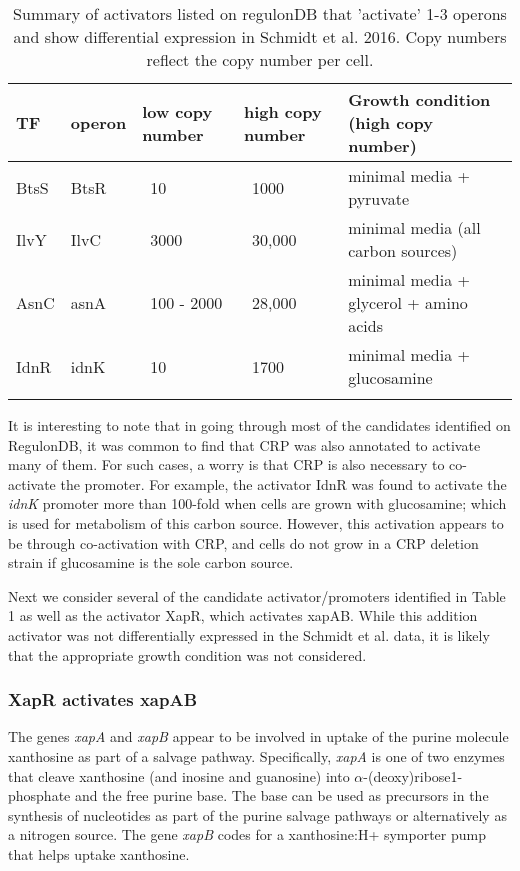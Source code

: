 \documentclass[12pt]{article}
\begin{document}
{\footnotesize
\begin{longtable}[c]{|l|l|l|l|l|}
  \toprule
     \textbf{TF} & \textbf{operon} & \textbf{low copy number} & \textbf{high copy number} & \textbf{Growth condition (high copy number)} \\
  \hline
   BtsS &                  BtsR &          ~10 &            ~1000 &                minimal media + pyruvate \\
   IlvY &                  IlvC &          ~3000 &          ~30,000 &              minimal media (all carbon sources) \\
   AsnC &                  asnA &          ~100 - 2000 &     ~28,000 &             minimal media + glycerol + amino acids \\
   IdnR &                 idnK &           ~10 &   ~1700 &              minimal media + glucosamine \\
    \bottomrule
\caption{Summary of activators listed on regulonDB that 'activate' 1-3 operons and show
differential expression in Schmidt et al. 2016. Copy numbers reflect the copy number per cell.}
\end{longtable}}

It is interesting to note that in going through most of the candidates identified on RegulonDB,
it was common to find that CRP was also annotated to activate many of them. For such
cases, a worry is that CRP is also necessary to co-activate the promoter. For
example, the activator IdnR was found to activate the \textit{idnK} promoter
more than 100-fold when cells are grown with glucosamine; which is used for
metabolism of this carbon source. However, this activation appears to be through
co-activation with CRP, and cells do not grow in a CRP deletion strain
if  glucosamine is the sole carbon source.

Next we consider several of the candidate activator/promoters identified in Table 1
as well as the activator XapR, which activates xapAB. While this addition activator
was not differentially expressed in the Schmidt et al. data, it is likely that the
appropriate growth condition was not considered.

\subsubsection*{XapR activates xapAB}

The genes \textit{xapA} and \textit{xapB} appear to be involved in uptake of the
purine molecule xanthosine as part of a salvage pathway. Specifically,
\textit{xapA} is one of two enzymes that cleave xanthosine (and inosine and
guanosine) into $\alpha$-(deoxy)ribose1-phosphate and the free purine base. The
base can be used as precursors in the synthesis of nucleotides as part of the
purine salvage pathways or alternatively as a nitrogen source. The gene
\textit{xapB} codes for a xanthosine:H+ symporter pump that helps uptake
xanthosine.
\end{document}
